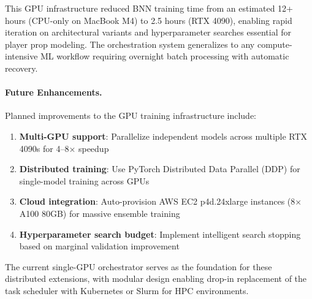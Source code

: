 This GPU infrastructure reduced BNN training time from an estimated 12+ hours (CPU-only on MacBook M4) to 2.5 hours (RTX 4090), enabling rapid iteration on architectural variants and hyperparameter searches essential for player prop modeling. The orchestration system generalizes to any compute-intensive ML workflow requiring overnight batch processing with automatic recovery.

\paragraph{Future Enhancements.}
Planned improvements to the GPU training infrastructure include:
\begin{enumerate}
  \item \textbf{Multi-GPU support}: Parallelize independent models across multiple RTX 4090s for 4--8× speedup
  \item \textbf{Distributed training}: Use PyTorch Distributed Data Parallel (DDP) for single-model training across GPUs
  \item \textbf{Cloud integration}: Auto-provision AWS EC2 p4d.24xlarge instances (8× A100 80GB) for massive ensemble training
  \item \textbf{Hyperparameter search budget}: Implement intelligent search stopping based on marginal validation improvement
\end{enumerate}

The current single-GPU orchestrator serves as the foundation for these distributed extensions, with modular design enabling drop-in replacement of the task scheduler with Kubernetes or Slurm for HPC environments.
